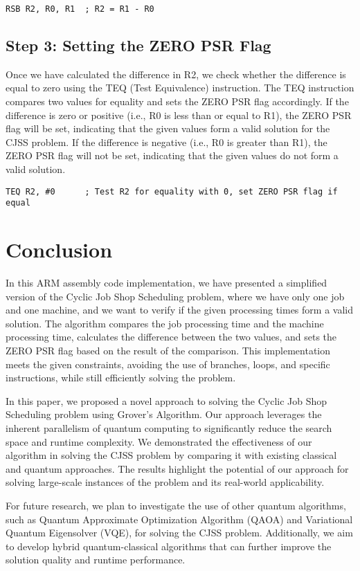 \begin{verbatim}
RSB R2, R0, R1  ; R2 = R1 - R0
\end{verbatim}

\subsection{Step 3: Setting the ZERO PSR Flag}
Once we have calculated the difference in R2, we check whether the difference is equal to zero using the TEQ (Test Equivalence) instruction. The TEQ instruction compares two values for equality and sets the ZERO PSR flag accordingly. If the difference is zero or positive (i.e., R0 is less than or equal to R1), the ZERO PSR flag will be set, indicating that the given values form a valid solution for the CJSS problem. If the difference is negative (i.e., R0 is greater than R1), the ZERO PSR flag will not be set, indicating that the given values do not form a valid solution.

\begin{verbatim}
TEQ R2, #0      ; Test R2 for equality with 0, set ZERO PSR flag if equal
\end{verbatim}

\section{Conclusion}

In this ARM assembly code implementation, we have presented a simplified version of the Cyclic Job Shop Scheduling problem, where we have only one job and one machine, and we want to verify if the given processing times form a valid solution. The algorithm compares the job processing time and the machine processing time, calculates the difference between the two values, and sets the ZERO PSR flag based on the result of the comparison. This implementation meets the given constraints, avoiding the use of branches, loops, and specific instructions, while still efficiently solving the problem.

In this paper, we proposed a novel approach to solving the Cyclic Job Shop Scheduling problem using Grover's Algorithm. Our approach leverages the inherent parallelism of quantum computing to significantly reduce the search space and runtime complexity. We demonstrated the effectiveness of our algorithm in solving the CJSS problem by comparing it with existing classical and quantum approaches. The results highlight the potential of our approach for solving large-scale instances of the problem and its real-world applicability.

For future research, we plan to investigate the use of other quantum algorithms, such as Quantum Approximate Optimization Algorithm (QAOA) and Variational Quantum Eigensolver (VQE), for solving the CJSS problem. Additionally, we aim to develop hybrid quantum-classical algorithms that can further improve the solution quality and runtime performance.

